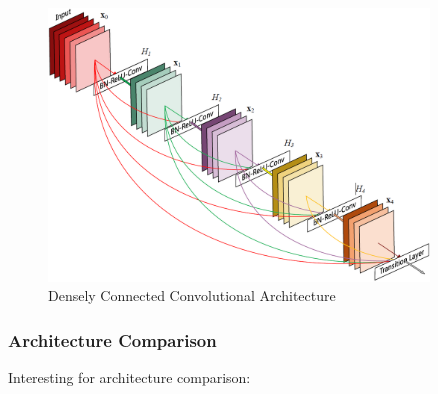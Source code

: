 \begin{figure}[h]
    \centering
    \includegraphics[width=0.9\textwidth]{images/dense-net-architecture}
    \caption{Densely Connected Convolutional Architecture \cite{densenet18}}
    \label{fig:densenet_architecture}
\end{figure}

\subsubsection{Architecture Comparison}
Interesting for architecture comparison: \cite{imseg_architecures}


\newpage
